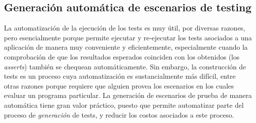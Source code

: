 \subsection{Generaci\'on autom\'atica de escenarios de testing}

La automatizaci\'on de la ejecuci\'on de los tests es muy \'util, por diversas razones, pero esencialmente porque permite ejecutar y re-ejecutar los tests asociados a una aplicaci\'on de manera muy conveniente y eficientemente, especialmente cuando la comprobaci\'on de que los resultados esperados coinciden con los obtenidos (los \emph{asserts}) tambi\'en se chequean autom\'aticamente. Sin embargo, la construcci\'on de tests es un proceso cuya automatizaci\'on es sustancialmente m\'as dif\'icil, entre otras razones porque requiere que alguien provea los escenarios en los cuales evaluar un programa particular. La generaci\'on de escenarios de prueba de manera autom\'atica tiene gran valor pr\'actico, puesto que permite automatizar parte del proceso de \emph{generaci\'on} de tests, y reducir los costos asociados a este proceso. 

